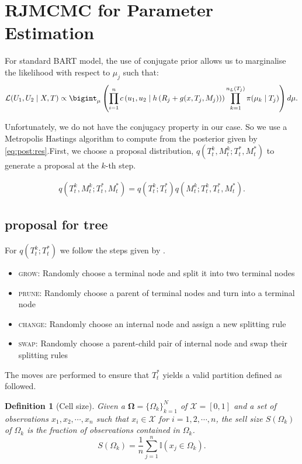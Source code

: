 \documentclass{amsart}
\newtheorem{definition}{Definition}[section]
\begin{document}
\section{RJMCMC for Parameter Estimation}\label{sec:rjmcmc}
For standard BART model, the use of conjugate prior allows us to marginalise the likelihood with respect to $\mu_j$ such that:
\begin{equation}
	\mathcal{L}(U_1,U_2\mid X, T)\propto \bigint_{\mu}\left(\prod_{i=1}^{n}c\left(u_{1},u_{2}\mid h\left(R_j+g(x, T_j, M_j)\right)\right)\prod_{k=1}^{n_L(T_j)}\pi(\mu_k\mid T_j)\right)d\mu.
\end{equation}

Unfortunately, we do not have the conjugacy property in our case. So we use a Metropolis Hastings algorithm to compute from the posterior given by \cref{eq:post:res}.First, we choose a proposal distribution, $q\left(T_t^k,M_t^k;T_t^\ast, M_t^\ast\right)$ to generate a proposal at the $k$-th step.

\begin{align}\label{eq:prop}
	q\left(T_t^k,M_t^k;T_t^\ast, M_t^\ast\right) = q\left(T_t^k;T_t^\ast\right) q\left(M_t^k;T_t^k, T_t^\ast, M_t^\ast\right).
\end{align}

\subsection{proposal for tree}
For $q\left(T_t^k;T_t^\ast\right)$ we follow the steps given by \citet{serafini2024lossbasedpriortreetopologies}. 

\begin{itemize}
	\item \textsc{grow}: Randomly choose a terminal node and split it into two terminal nodes
	\item \textsc{prune}: Randomly choose a parent of terminal nodes and turn into a terminal node
	\item \textsc{change}: Randomly choose an internal node and assign a new splitting rule
	\item \textsc{swap}: Randomly choose a parent-child pair of internal node and swap their splitting rules
\end{itemize}

The moves are performed to ensure that $T_t^\ast$ yields a valid partition defined as followed.

\begin{definition}[Cell size] Given a $\mathbf{\Omega} = \{\Omega_k\}_{k=1}^N$ of $\mathcal{X} = [0,1]$ and a set of observations $x_1, x_2, \cdots, x_n$ such that $x_i\in \mathcal{X}$ for $i=1,2,\cdots, n$, the sell size $S(\Omega_k)$ of $\Omega_k$
	is the fraction of observations contained in $\Omega_k$.
	\begin{equation*}
		S(\Omega_k) = \frac{1}{n}\sum_{j=1}^n \mathbb{I}(x_j\in \Omega_k).
	\end{equation*}
\end{definition}
\end{document}
